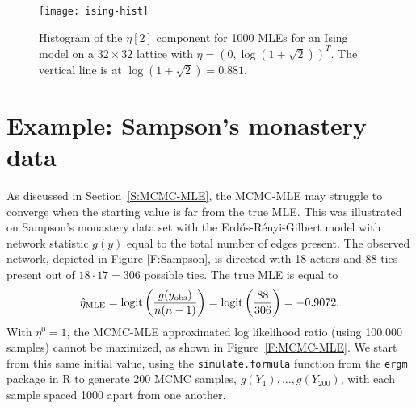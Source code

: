 \begin{figure}[h]
\begin{center}
\texttt{[image: ising-hist]}
\end{center}
\caption{Histogram of the $\eta[2]$ component for 1000 MLEs for 
an Ising model on a $32 \times 32$ lattice with $\eta = \left(0, \log(1 + \sqrt{2}) 
\right)^T$.  The vertical line is at $\log(1 + \sqrt{2}) = 0.881$. }
\label{F:ising-hist}
\end{figure}

%
%
%

\section{Example: Sampson's monastery data}
As discussed in Section~\ref{S:MCMC-MLE}, the MCMC-MLE may struggle to converge when the 
starting value is far from the true MLE.  This was illustrated on Sampson's monastery data set with the Erd\H{o}s-R\'{e}nyi-Gilbert model with network statistic $g(y)$ equal to 
the total number of edges present.
The observed network, depicted in Figure \ref{F:Sampson}, is directed with 18 actors and 
88 ties present out of $18 \cdot 17=306$ possible ties.  The true MLE is equal to 
\begin{align*}
	\hat{\eta}_{\textrm{MLE}} = \operatorname{logit}\left( \frac{g(y_{\textrm{obs}})}{n(n-1)}\right) = \operatorname{logit} \left( \frac{88}{306}\right ) = -0.9072.
\end{align*}
With $\eta^0 = 1$, the MCMC-MLE approximated log likelihood ratio (using 100,000 samples) 
cannot be maximized, as shown in Figure~\ref{F:MCMC-MLE}.
We start from this same initial value, using the \texttt{simulate.formula} function
from the \texttt{ergm} package in R to generate 200 MCMC samples, $g(Y_1), \ldots, g(Y_
{200})$, with each sample spaced 1000 apart from one another.

